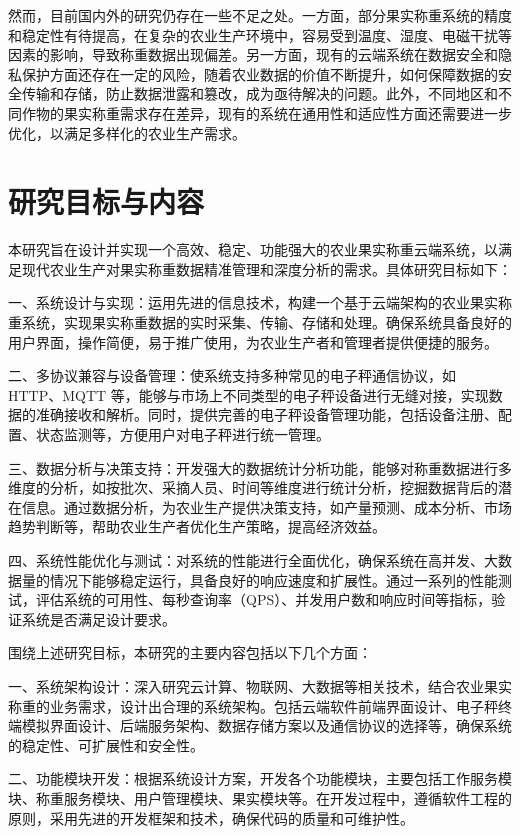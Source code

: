 \documentclass{xduugthesis}
\begin{document}
然而，目前国内外的研究仍存在一些不足之处。一方面，部分果实称重系统的精度和稳定性有待提高，在复杂的农业生产环境中，容易受到温度、湿度、电磁干扰等因素的影响，导致称重数据出现偏差\cite{汤建华2018}。另一方面，现有的云端系统在数据安全和隐私保护方面还存在一定的风险，随着农业数据的价值不断提升，如何保障数据的安全传输和存储，防止数据泄露和篡改，成为亟待解决的问题。此外，不同地区和不同作物的果实称重需求存在差异，现有的系统在通用性和适应性方面还需要进一步优化，以满足多样化的农业生产需求。

\section{研究目标与内容}

本研究旨在设计并实现一个高效、稳定、功能强大的农业果实称重云端系统，以满足现代农业生产对果实称重数据精准管理和深度分析的需求。具体研究目标如下：

一、系统设计与实现：运用先进的信息技术，构建一个基于云端架构的农业果实称重系统，实现果实称重数据的实时采集、传输、存储和处理。确保系统具备良好的用户界面，操作简便，易于推广使用，为农业生产者和管理者提供便捷的服务。

二、多协议兼容与设备管理：使系统支持多种常见的电子秤通信协议，如 HTTP、MQTT 等，能够与市场上不同类型的电子秤设备进行无缝对接，实现数据的准确接收和解析。同时，提供完善的电子秤设备管理功能，包括设备注册、配置、状态监测等，方便用户对电子秤进行统一管理。

三、数据分析与决策支持：开发强大的数据统计分析功能，能够对称重数据进行多维度的分析，如按批次、采摘人员、时间等维度进行统计分析，挖掘数据背后的潜在信息。通过数据分析，为农业生产提供决策支持，如产量预测、成本分析、市场趋势判断等，帮助农业生产者优化生产策略，提高经济效益。

四、系统性能优化与测试：对系统的性能进行全面优化，确保系统在高并发、大数据量的情况下能够稳定运行，具备良好的响应速度和扩展性。通过一系列的性能测试，评估系统的可用性、每秒查询率（QPS）、并发用户数和响应时间等指标，验证系统是否满足设计要求。

围绕上述研究目标，本研究的主要内容包括以下几个方面：

一、系统架构设计：深入研究云计算、物联网、大数据等相关技术，结合农业果实称重的业务需求，设计出合理的系统架构。包括云端软件前端界面设计、电子秤终端模拟界面设计、后端服务架构、数据存储方案以及通信协议的选择等，确保系统的稳定性、可扩展性和安全性。

二、功能模块开发：根据系统设计方案，开发各个功能模块，主要包括工作服务模块、称重服务模块、用户管理模块、果实模块等。在开发过程中，遵循软件工程的原则，采用先进的开发框架和技术，确保代码的质量和可维护性。
\end{document}
